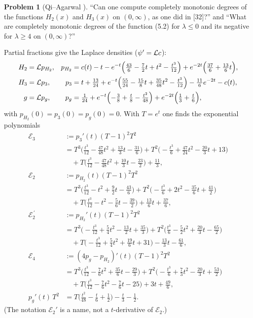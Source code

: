 \documentclass[11pt]{amsart}
\theoremstyle{definition}
\newtheorem{problem}[theorem]{Problem}
\theoremstyle{remark}
\begin{document}
\begin{problem}[{Qi--Agarwal \cite[Sections~5.4 and 5.5]{R2-QiAgarwal2019}}]\label{R2:prob:EF}
``Can one compute completely monotonic degrees of the functions $H_2(x)$ and
$H_3(x)$ on $(0,\infty)$, as one did in [32]?'' and ``What are completely
monotonic degrees of the function (5.2) for $\lambda\le0$ and its negative
for $\lambda\ge4$ on $(0,\infty)$?''
\end{problem}

Partial fractions give the Laplace densities ($\psi'=\mathcal{L} c$):
\begin{align*}
 H_2&=\mathcal{L} p_{H_2},& p_{H_2}&=c(t)-t-e^{-t}\Bigl(\tfrac{43}6-\tfrac72t+t^2-\tfrac{t^3}{12}\Bigr)+e^{-2t}\Bigl(\tfrac{37}6+\tfrac{13}6t\Bigr),\\
 H_3&=\mathcal{L} p_3,& p_3&=t+\tfrac{13}{24}+e^{-t}\Bigl(\tfrac{55}{24}-\tfrac{15}8t+\tfrac{35}{48}t^2-\tfrac{t^3}{12}\Bigr)-\tfrac{11}6e^{-2t}-c(t),\\
 g&=\mathcal{L} p_g,& p_g&=\tfrac1{24}+e^{-t}\Bigl(-\tfrac38+\tfrac t8-\tfrac{t^2}{48}\Bigr)+e^{-2t}\Bigl(\tfrac13+\tfrac t6\Bigr),
\end{align*}
with $p_{H_2}(0)=p_3(0)=p_g(0)=0$. With $T=e^t$ one finds the exponential
polynomials
\begin{align*}
 \mathcal E_3&:=p_3'(t)(T-1)^2T^2\\
 &=T^3\bigl(\tfrac{t^3}{12}-\tfrac{47}{48}t^2+\tfrac{13}3t-\tfrac{31}6\bigr)
 +T^2\bigl(-\tfrac{t^3}6+\tfrac{47}{24}t^2-\tfrac{20}3t+13\bigr)\\
 &\quad+T\bigl(\tfrac{t^3}{12}-\tfrac{47}{48}t^2+\tfrac{10}3t-\tfrac{23}2\bigr)+\tfrac{11}3,\\
 \mathcal E_{2}&:=p_{H_2}(t)(T-1)^2T^2\\
 &=T^3\bigl(\tfrac{t^3}{12}-t^2+\tfrac92t-\tfrac{43}6\bigr)
 +T^2\bigl(-\tfrac{t^3}6+2t^2-\tfrac{35}6t+\tfrac{41}2\bigr)\\
 &\quad+T\bigl(\tfrac{t^3}{12}-t^2-\tfrac56t-\tfrac{39}2\bigr)+\tfrac{13}6t+\tfrac{37}6,\\
 \mathcal E_{2}^{\,\prime}&:=p_{H_2}'(t)(T-1)^2T^2\\
 &=T^3\bigl(-\tfrac{t^3}{12}+\tfrac54t^2-\tfrac{13}2t+\tfrac{35}3\bigr)
 +T^2\bigl(\tfrac{t^3}6-\tfrac52t^2+\tfrac{20}3t-\tfrac{65}2\bigr)\\
 &\quad+T\bigl(-\tfrac{t^3}{12}+\tfrac54t^2+\tfrac{19}6t+31\bigr)-\tfrac{13}3t-\tfrac{61}6,\\
 \mathcal E_4&:=(4p_g-p_{H_2})'(t)(T-1)^2T^2\\
 &=T^3\bigl(\tfrac{t^3}{12}-\tfrac76t^2+\tfrac{35}6t-\tfrac{29}3\bigr)
 +T^2\bigl(-\tfrac{t^3}6+\tfrac73t^2-\tfrac{20}3t+\tfrac{53}2\bigr)\\
 &\quad+T\bigl(\tfrac{t^3}{12}-\tfrac76t^2-\tfrac76t-25\bigr)+3t+\tfrac{49}6,\\
 p_g'(t)\,T^2&=T\bigl(\tfrac{t^2}{48}-\tfrac t6+\tfrac12\bigr)-\tfrac t3-\tfrac12 .
\end{align*}
(The notation $\mathcal E_2'$ is a name, not a $t$-derivative of $\mathcal E_2$.)
\end{document}
